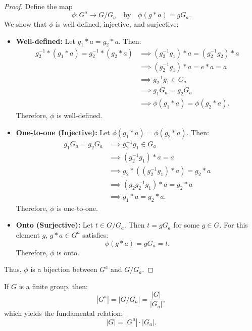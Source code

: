 \begin{proof}
Define the map
\[
\phi : G^a \longrightarrow G/G_a \quad \text{by} \quad \phi(g * a) = g G_a.
\]
We show that $\phi$ is well-defined, injective, and surjective:

\begin{itemize}
    \item \textbf{Well-defined:} Let $g_1 * a = g_2 * a$. Then:
    \begin{align*}
    g_2^{-1} * (g_1 * a) = g_2^{-1} * (g_2 * a) &\implies (g_2^{-1} g_1) * a = (g_2^{-1} g_2) * a \\
    &\implies (g_2^{-1} g_1) * a = e * a = a \\
    &\implies g_2^{-1} g_1 \in G_a \\
    &\implies g_1 G_a = g_2 G_a \\
    &\implies \phi(g_1 * a) = \phi(g_2 * a).
    \end{align*}
    Therefore, $\phi$ is well-defined.
    
    \item \textbf{One-to-one (Injective):} Let $\phi(g_1 * a) = \phi(g_2 * a)$. Then:
    \begin{align*}
    g_1 G_a = g_2 G_a &\implies g_2^{-1} g_1 \in G_a \\
    &\implies (g_2^{-1} g_1) * a = a \\
    &\implies g_2 * ((g_2^{-1} g_1) * a) = g_2 * a \\
    &\implies (g_2 g_2^{-1} g_1) * a = g_2 * a \\
    &\implies g_1 * a = g_2 * a.
    \end{align*}
    Therefore, $\phi$ is one-to-one.
    
    \item \textbf{Onto (Surjective):} Let $t \in G/G_a$. Then $t = g G_a$ for some $g \in G$. For this element $g$, $g * a \in G^a$ satisfies:
    \[
    \phi(g * a) = g G_a = t.
    \]
    Therefore, $\phi$ is onto.
\end{itemize}
Thus, $\phi$ is a bijection between $G^a$ and $G/G_a$.
\end{proof}

\begin{note}
If $G$ is a finite group, then:
\[
|G^a| = |G / G_a| = \frac{|G|}{|G_a|},
\]
which yields the fundamental relation:
\[
|G| = |G^a| \cdot |G_a|.
\]
\end{note}
